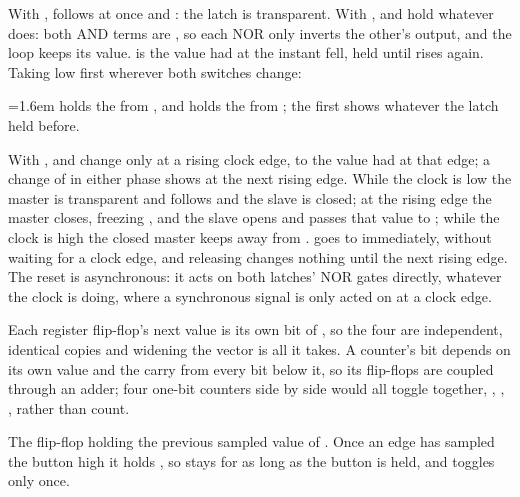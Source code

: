 

With ,  follows  at once and : the latch is
transparent. With ,  and  hold whatever  does: both AND
terms are , so each NOR only inverts the other's output, and the loop keeps its value.
 is the value  had at the instant  fell, held until
 rises again. Taking  low first wherever both switches change:\par
\smallskip\noindent\hspace{1.6em}%
\par\smallskip
\noindent\hangindent=1.6em\hspace{1.6em} holds the  from , and 
holds the  from ; the first  shows whatever the latch held before.

With ,  and  change only at a rising clock edge, to the
value  had at that edge; a change of  in either phase shows at the next rising edge.
While the clock is low the master is transparent and follows  and the slave is closed; at
the rising edge the master closes, freezing , and the slave opens and passes that value to
; while the clock is high the closed master keeps  away from .
 goes to  immediately, without waiting for a clock edge, and releasing
 changes nothing until the next rising edge. The reset is asynchronous: it acts on
both latches' NOR gates directly, whatever the clock is doing, where a synchronous signal is only
acted on at a clock edge.

Each register flip-flop's next value is its own bit of , so the four are independent,
identical copies and widening the vector is all it takes. A counter's bit  depends on its
own value and the carry from every bit below it, so its flip-flops are coupled through an adder;
four one-bit counters side by side would all toggle together, , ,
, rather than count.

The flip-flop holding the previous sampled value of . Once an edge has sampled
the button high it holds , so  stays  for as long as
the button is held, and  toggles only once.
